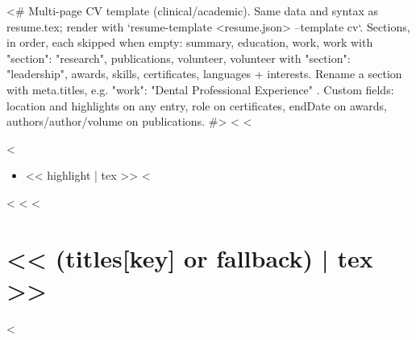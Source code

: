 <# Multi-page CV template (clinical/academic). Same data and syntax as resume.tex;
   render with `resume-template <resume.json> --template cv`.
   Sections, in order, each skipped when empty:
     summary, education, work, work with "section": "research", publications,
     volunteer, volunteer with "section": "leadership", awards, skills,
     certificates, languages + interests.
   Rename a section with meta.titles, e.g. { "work": "Dental Professional Experience" }.
   Custom fields: location and highlights on any entry, role on certificates,
   endDate on awards, authors/author/volume on publications. #>
<%
<%
  \item
<%
        \begin{itemize}
<%
          \item << highlight | tex >>
<%
        \end{itemize}
<%
<%
<%
\section{<< (titles[key] or fallback) | tex >>}
<%
\documentclass[letterpaper,12pt]{article}

\usepackage[T1]{fontenc}
\usepackage{lmodern}
\usepackage[margin=0.5in, top=0.35in]{geometry}
\usepackage{titlesec}
\usepackage{enumitem}
\usepackage[hidelinks]{hyperref}
\usepackage{bookmark} %
\usepackage[dvipsnames]{xcolor}
\usepackage{fontawesome}

\renewcommand{\labelitemi}{$\bullet$}

\raggedbottom\raggedright\titleformat{\section}{
  \bfseries\color{maincolor}\vspace{-4pt}\raggedright\large
}{}{0em}{}[\color{maincolor}\titlerule\vspace{-5pt}]

